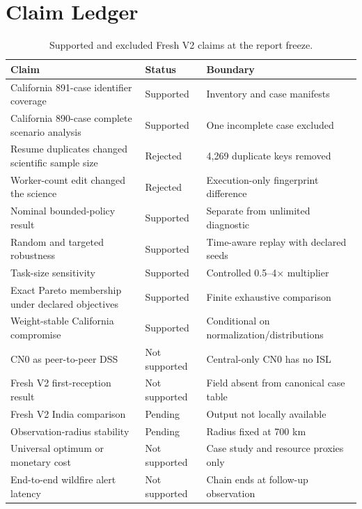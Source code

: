 \section{Claim Ledger}

\begin{table}[p]
\centering
\small
\caption{Supported and excluded Fresh V2 claims at the report freeze.}
\label{tab:claim_ledger}
\begin{tabularx}{\textwidth}{Y L{0.18\textwidth}Y}
\toprule
Claim & Status & Boundary \\
\midrule
California 891-case identifier coverage & Supported & Inventory and case manifests \\
California 890-case complete scenario analysis & Supported & One incomplete case excluded \\
Resume duplicates changed scientific sample size & Rejected & 4,269 duplicate keys removed \\
Worker-count edit changed the science & Rejected & Execution-only fingerprint difference \\
Nominal bounded-policy result & Supported & Separate from unlimited diagnostic \\
Random and targeted robustness & Supported & Time-aware replay with declared seeds \\
Task-size sensitivity & Supported & Controlled 0.5--4$\times$ multiplier \\
Exact Pareto membership under declared objectives & Supported & Finite exhaustive comparison \\
Weight-stable California compromise & Supported & Conditional on normalization/distributions \\
CN0 as peer-to-peer DSS & Not supported & Central-only CN0 has no ISL \\
Fresh V2 first-reception result & Not supported & Field absent from canonical case table \\
Fresh V2 India comparison & Pending & Output not locally available \\
Observation-radius stability & Pending & Radius fixed at 700 km \\
Universal optimum or monetary cost & Not supported & Case study and resource proxies only \\
End-to-end wildfire alert latency & Not supported & Chain ends at follow-up observation \\
\bottomrule
\end{tabularx}
\end{table}

